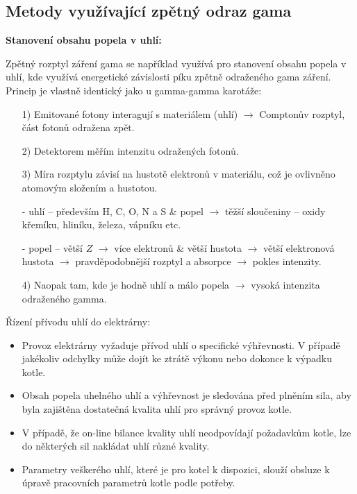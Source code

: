 \subsection{Metody využívající zpětný odraz gama}

\textbf{Stanovení obsahu popela v uhlí:}

Zpětný rozptyl záření gama se například využívá pro stanovení obsahu popela v uhlí, kde využívá energetické závislosti píku zpětně odraženého gama záření. Princip je vlastně identický jako u gamma-gamma karotáže:

\begin{itemize}
    \item[1)] Emitované fotony interagují s materiálem (uhlí) $\rightarrow$ Comptonův rozptyl, část fotonů odražena zpět.
    \item[2)] Detektorem měřím intenzitu odražených fotonů.
    \item[3)] Míra rozptylu závisí na hustotě elektronů v materiálu, což je ovlivněno atomovým složením a hustotou.
    \item[-] uhlí -- především H, C, O, N a S \& popel $\rightarrow$ těžší sloučeniny -- oxidy křemíku, hliníku, železa, vápníku etc.
    \item[-] popel -- větší $Z$ $\rightarrow$ více elektronů \& větší hustota $\rightarrow$ větší elektronová hustota $\rightarrow$ pravděpodobnější rozptyl a absorpce $\rightarrow$ pokles intenzity.
    \item[4)] Naopak tam, kde je hodně uhlí a málo popela $\rightarrow$ vysoká intenzita odraženého gamma.
\end{itemize}

Řízení přívodu uhlí do elektrárny:

\begin{itemize}
     \item Provoz elektrárny vyžaduje přívod uhlí o specifické výhřevnosti. V případě jakékoliv odchylky může dojít ke ztrátě výkonu nebo dokonce k výpadku kotle.
     \item Obsah popela uhelného uhlí a výhřevnost je sledována před plněním sila, aby byla zajištěna dostatečná kvalita uhlí pro správný provoz kotle.
     \item  V případě, že on-line bilance kvality uhlí neodpovídají požadavkům kotle, lze do některých sil nakládat uhlí různé kvality.
    \item  Parametry veškerého uhlí, které je pro kotel k dispozici, slouží obsluze k úpravě pracovních parametrů kotle podle potřeby.
\end{itemize}

